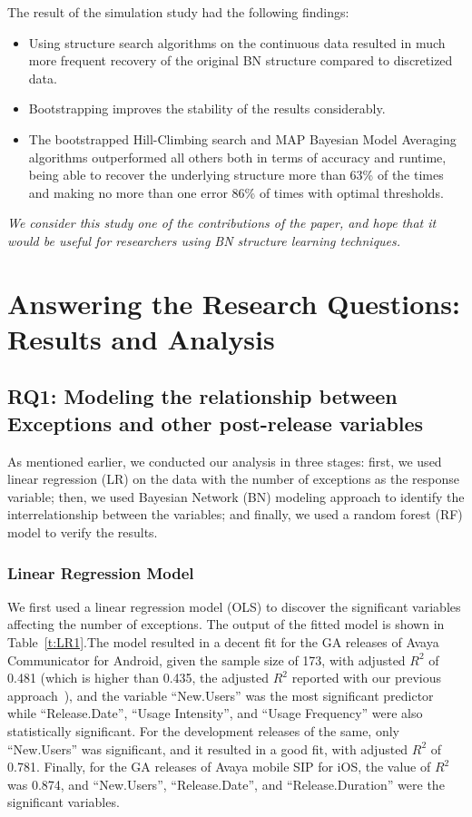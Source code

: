 \documentclass[smallcondensed]{svjour3}     %
\begin{document}
The result of the simulation study had the following findings:
\begin{itemize}
\item Using structure search algorithms on the continuous data resulted in much more frequent recovery of the original BN structure compared to discretized data.
\item Bootstrapping  improves the stability of the results considerably.
\item The bootstrapped Hill-Climbing search and MAP Bayesian Model Averaging algorithms outperformed all others both in terms of accuracy and runtime, being able to recover the underlying structure more than 63\% of the times and making no more than one error 86\% of times with optimal thresholds. 
\end{itemize}

\emph{We consider this study one of the contributions of the paper, and hope that it 
would be useful for researchers using BN structure learning techniques.}


\section{Answering the Research Questions: Results and Analysis}\label{s:result}

\subsection{RQ1: Modeling the relationship between Exceptions and other post-release variables}\label{s:explain}
As mentioned earlier, we conducted our analysis in three stages: first, we used linear regression (LR) on the data with the number of exceptions as the response variable; then, we used Bayesian Network (BN) modeling approach to identify the interrelationship between the variables; and finally, we used a random forest (RF) model to verify the results. 

\vspace{-10pt}
\subsubsection{Linear Regression Model}
We first used a linear regression model (OLS) to discover the significant variables affecting the number of exceptions. The  output  of the fitted model is shown in Table~\ref{t:LR1}.The model resulted in a decent fit for the GA releases of Avaya Communicator for Android, given the sample size of 173, with adjusted $R^2$ of 0.481 (which is higher than  0.435, the adjusted $R^2$  reported with our previous approach~\cite{dey2018modeling}), and the variable ``New.Users'' was the most significant predictor while ``Release.Date'', ``Usage Intensity'', and ``Usage Frequency'' were also statistically significant. For the development releases of the same, only ``New.Users'' was significant, and it resulted in a good fit, with adjusted $R^2$ of 0.781.
Finally, for the GA releases of Avaya mobile SIP for iOS, the value of $R^2$ was 0.874, and ``New.Users'', ``Release.Date'', and ``Release.Duration'' were the significant variables.
\end{document}
